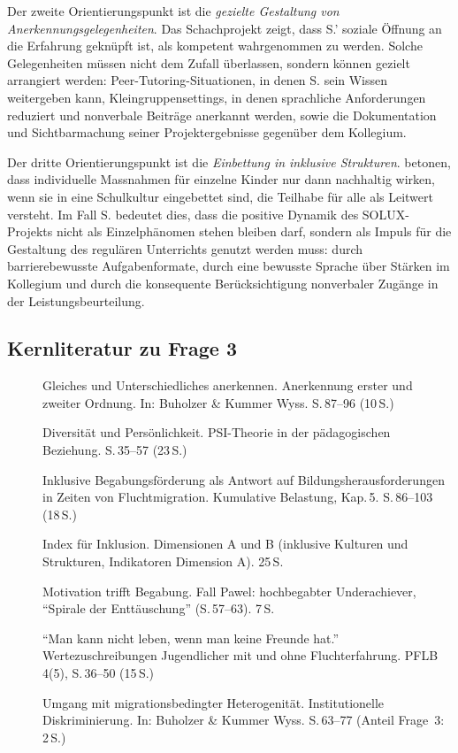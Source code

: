 \documentclass[ngerman, a4paper]{article}
\begin{document}
Der zweite Orientierungspunkt ist die \textit{gezielte Gestaltung von
Anerkennungsgelegenheiten}. Das Schachprojekt zeigt, dass S.' soziale Öffnung an
die Erfahrung geknüpft ist, als kompetent wahrgenommen zu werden. Solche
Gelegenheiten müssen nicht dem Zufall überlassen, sondern können gezielt arrangiert
werden: Peer-Tutoring-Situationen, in denen S. sein Wissen weitergeben kann,
Kleingruppensettings, in denen sprachliche Anforderungen reduziert und nonverbale
Beiträge anerkannt werden, sowie die Dokumentation und Sichtbarmachung seiner
Projektergebnisse gegenüber dem Kollegium.

Der dritte Orientierungspunkt ist die \textit{Einbettung in inklusive Strukturen}.
\textcite[Dim.\,A--B]{booth2019index} betonen, dass individuelle Massnahmen für einzelne Kinder nur dann
nachhaltig wirken, wenn sie in eine Schulkultur eingebettet sind, die Teilhabe für
alle als Leitwert versteht. Im Fall S. bedeutet dies, dass die positive Dynamik des
SOLUX-Projekts nicht als Einzelphänomen stehen bleiben darf, sondern als Impuls für
die Gestaltung des regulären Unterrichts genutzt werden muss: durch barrierebewusste
Aufgabenformate, durch eine bewusste Sprache über Stärken im Kollegium und durch die
konsequente Berücksichtigung nonverbaler Zugänge in der Leistungsbeurteilung.
 
\subsection{Kernliteratur zu Frage 3}
 
\begin{description}
  \item[\cite{grossrieder2010anerkennung}] Gleiches und Unterschiedliches
    anerkennen. Anerkennung erster und zweiter Ordnung.
    In: Buholzer \& Kummer Wyss. S.\,87--96 (10\,S.)
  \item[\cite{kuhl2019diversitaet}] Diversität und Persönlichkeit.
    PSI-Theorie in der pädagogischen Beziehung. S.\,35--57 (23\,S.)
  \item[\cite{behrensen2019inklusive}] Inklusive Begabungsförderung als Antwort
    auf Bildungsherausforderungen in Zeiten von Fluchtmigration.
    Kumulative Belastung, Kap.\,5. S.\,86--103 (18\,S.)
  \item[\cite{booth2019index}] Index für Inklusion. Dimensionen A und B
    (inklusive Kulturen und Strukturen, Indikatoren Dimension A). 25\,S.
  \item[\cite{lehwald2017motivation}] Motivation trifft Begabung.
    Fall Pawel: hochbegabter Underachiever, \enquote{Spirale der Enttäuschung}
    (S.\,57--63). 7\,S.
  \item[\cite{baumert2022freundschaftwerte}] \enquote{Man kann nicht leben,
    wenn man keine Freunde hat.} Wertezuschreibungen Jugendlicher mit und
    ohne Fluchterfahrung. PFLB 4(5), S.\,36--50 (15\,S.)
  \item[\cite{kappus2010migration}] Umgang mit migrationsbedingter
    Heterogenität. Institutionelle Diskriminierung.
    In: Buholzer \& Kummer Wyss. S.\,63--77 (Anteil Frage~3: 2\,S.)
\end{description}
 
\end{document}
